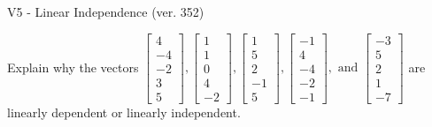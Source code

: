 \begin{exercise}
  \begin{exerciseTitle}V5 - Linear Independence (ver. 352)\end{exerciseTitle}
  \begin{exerciseStatement}
    Explain why the vectors \(\left[\begin{array}{r}
4 \\
-4 \\
-2 \\
3 \\
5
\end{array}\right] , \left[\begin{array}{r}
1 \\
1 \\
0 \\
4 \\
-2
\end{array}\right] , \left[\begin{array}{r}
1 \\
5 \\
2 \\
-1 \\
5
\end{array}\right] , \left[\begin{array}{r}
-1 \\
4 \\
-4 \\
-2 \\
-1
\end{array}\right] , \text{ and } \left[\begin{array}{r}
-3 \\
5 \\
2 \\
1 \\
-7
\end{array}\right]\) are linearly dependent or linearly independent.	



\end{exerciseStatement}
\end{exercise}
